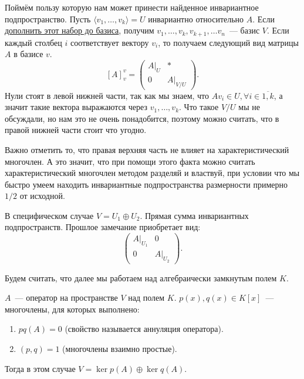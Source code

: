 \begin{remark}
    Поймём пользу которую нам может принести найденное инвариантное подпространство.
    Пусть $\langle v_1,\dots, v_k\rangle = U$ инвариантно относительно $A$. 
    Если \hyperref[thm:О дополнении до базиса]{дополнить этот набор до базиса}, получим 
    $v_1,\dots, v_k, v_{k + 1},\dots v_n$~--- базис $V$.
    Если каждый столбец $i$ соответствует вектору $v_i$, то получаем следующий вид матрицы $A$
    в базисе $v$.
    \[
        [A]^v_v = 
        \left(\begin{array}{c|c}
                A|_U & *\\
                \hline
                0 & A|_{V/U}
        \end{array}\right)
    .\] 
    Нули стоят в левой нижней части, так как мы знаем, что $A v_i \in U, \forall i\in \overline{1,k}$,
    а значит такие вектора выражаются через $v_1,\dots,v_k$.
    Что такое $V/U$ мы не обсуждали, но нам это не очень понадобится, поэтому можно считать, что в правой нижней части стоит что
    угодно. 
    
    Важно отметить то, что правая верхняя часть не влияет на характеристический многочлен.
    А это значит, что при помощи этого факта можно считать характеристический многочлен методом
    разделяй и властвуй, при условии что мы быстро умеем находить инвариантные подпространства
    размерности примерно $1/2$ от исходной.
\end{remark}
\begin{remark}
    В специфическом случае
    $V = U_1 \oplus U_2$. Прямая сумма инвариантных подпространств. Прошлое замечание приобретает вид:
     \[
         \left(\begin{array}{c|c}
                 A|_{U_1} & 0\\
                 \hline
                 0 & A|_{U_2}
         \end{array}\right)
    .\] 
\end{remark}
\begin{remark}
    Будем считать, что далее мы работаем над алгебраически замкнутым полем $K$.
\end{remark}
\begin{theorem}
    $A$~--- оператор на пространстве $V$ над полем $K$. $p(x), q(x) \in K[x]$~--- многочлены, для которых выполнено: 
     \begin{enumerate}
         \item $pq(A) = 0$ (свойство называется аннуляция оператора).
         \item $(p, q) = 1$ (многочлены взаимно простые).
    \end{enumerate}
    Тогда в этом случае $V = \ker p(A) \oplus \ker q(A)$.
\end{theorem}
